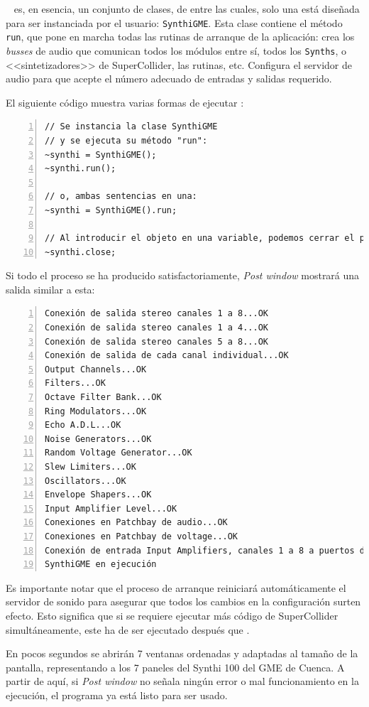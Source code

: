 \appName~ es, en esencia, un conjunto de clases, de entre las cuales, solo una está diseñada para ser instanciada por el usuario: \texttt{SynthiGME}. Esta clase contiene el método \texttt{run}, que pone en marcha todas las rutinas de arranque de la aplicación: crea los \textit{busses} de audio que comunican todos los módulos entre sí, todos los \texttt{Synths}, o <<sintetizadores>> de SuperCollider, las rutinas, etc. Configura el servidor de audio para que acepte el número adecuado de entradas y salidas requerido.

El siguiente código muestra varias formas de ejecutar \appName:
\begin{lstlisting}[style=SuperCollider-IDE, frame=single,  numbers=left]
// Se instancia la clase SynthiGME
// y se ejecuta su método "run":
~synthi = SynthiGME();
~synthi.run();

// o, ambas sentencias en una:
~synthi = SynthiGME().run;

// Al introducir el objeto en una variable, podemos cerrar el programa ejecutando el método "close":
~synthi.close;
\end{lstlisting}

Si todo el proceso se ha producido satisfactoriamente, \textit{Post window} mostrará una salida similar a esta:

\begin{lstlisting}[frame=single, numbers=left]
Conexión de salida stereo canales 1 a 8...OK
Conexión de salida stereo canales 1 a 4...OK
Conexión de salida stereo canales 5 a 8...OK
Conexión de salida de cada canal individual...OK
Output Channels...OK
Filters...OK
Octave Filter Bank...OK
Ring Modulators...OK
Echo A.D.L...OK
Noise Generators...OK
Random Voltage Generator...OK
Slew Limiters...OK
Oscillators...OK
Envelope Shapers...OK
Input Amplifier Level...OK
Conexiones en Patchbay de audio...OK
Conexiones en Patchbay de voltage...OK
Conexión de entrada Input Amplifiers, canales 1 a 8 a puertos de SC...OK
SynthiGME en ejecución
\end{lstlisting}



Es importante notar que el proceso de arranque reiniciará automáticamente el servidor de sonido para asegurar que todos los cambios en la configuración surten efecto. Esto significa que si se requiere ejecutar más código de SuperCollider simultáneamente, este ha de ser ejecutado después que \appName. 

En pocos segundos se abrirán 7 ventanas ordenadas y adaptadas al tamaño de la pantalla, representando a los 7 paneles del Synthi 100 del GME de Cuenca. A partir de aquí, si \textit{Post window} no señala ningún error o mal funcionamiento en la ejecución, el programa ya está listo para ser usado.




